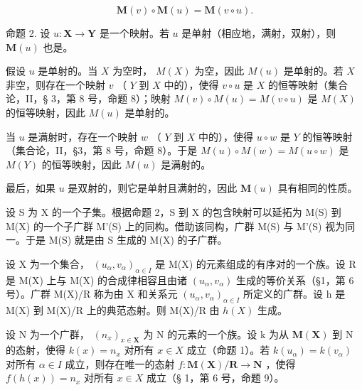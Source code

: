 \[
\mathbf {M} (v) \circ \mathbf {M} (u) = \mathbf {M} (v \circ u).
\]

命题 2. 设 \(u: \mathbf{X} \to \mathbf{Y}\) 是一个映射。若 \(u\) 是单射（相应地，满射，双射），则 \(\mathbf{M}(u)\) 也是。

假设 \(u\) 是单射的。当 \(X\) 为空时， \(M(X)\) 为空，因此 \(M(u)\) 是单射的。若 \(X\) 非空，则存在一个映射 \(v\) （ \(Y\) 到 \(X\) 中的），使得 \(v \circ u\) 是 \(X\) 的恒等映射（集合论，II，§ 3，第 8 号，命题 8）；映射 \(M(v) \circ M(u) = M(v \circ u)\) 是 \(M(X)\) 的恒等映射，因此 \(M(u)\) 是单射的。

当 \(u\) 是满射时，存在一个映射 \(w\) （ \(Y\) 到 \(X\) 中的），使得 \(u \circ w\) 是 \(Y\) 的恒等映射（集合论，II，§3，第 8 号，命题 8）。于是 \(M(u) \circ M(w) = M(u \circ w)\) 是 \(M(Y)\) 的恒等映射，因此 \(M(u)\) 是满射的。

最后，如果 \(u\) 是双射的，则它是单射且满射的，因此 \(\mathbf{M}(u)\) 具有相同的性质。

设 S 为 X 的一个子集。根据命题 2，S 到 X 的包含映射可以延拓为 M(S) 到 M(X) 的一个子广群 M'(S) 上的同构。借助该同构，广群 M(S) 与 M'(S) 视为同一。于是 M(S) 就是由 S 生成的 M(X) 的子广群。

设 X 为一个集合， \((u_{\alpha}, v_{\alpha})_{\alpha \in I}\) 是 M(X) 的元素组成的有序对的一个族。设 R 是 M(X) 上与 M(X) 的合成律相容且由诸 \((u_{\alpha}, v_{\alpha})\) 生成的等价关系（§1，第 6 号）。广群 M(X)/R 称为由 X 和关系元 \((u_{\alpha}, v_{\alpha})_{\alpha \in I}\) 所定义的广群。设 h 是 M(X) 到 M(X)/R 上的典范态射。则 M(X)/R 由 \(h(X)\) 生成。

设 N 为一个广群， \((n_{x})_{x\in\mathbf{X}}\) 为 N 的元素的一个族。设 k 为从 \(\mathbf{M}(\mathbf{X})\) 到 N 的态射，使得 \(k(x)=n_{x}\) 对所有 \(x\in X\) 成立（命题 1）。若 \(k(u_{\alpha})=k(v_{\alpha})\) 对所有 \(\alpha\in I\) 成立，则存在唯一的态射 \(f\colon\mathbf{M}(\mathbf{X})/\mathbf{R}\to\mathbf{N}\) ，使得 \(f(h(x))=n_{x}\) 对所有 \(x\in X\) 成立（§ 1，第 6 号，命题 9）。

